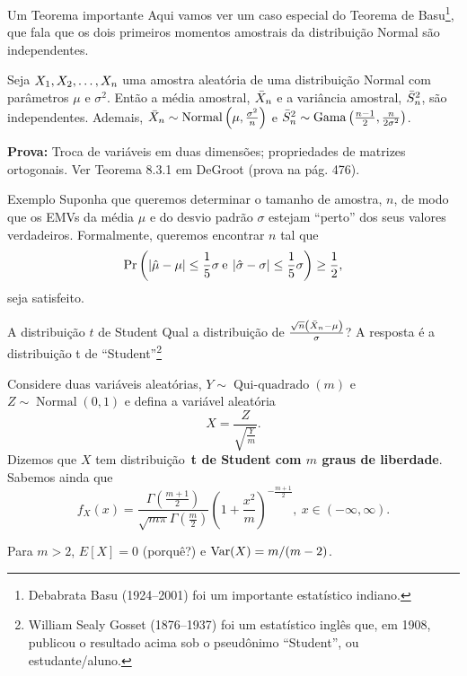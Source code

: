 \begin{frame}{Um Teorema importante}
 Aqui vamos ver um caso especial do Teorema de Basu\footnote{Debabrata Basu (1924--2001) foi um importante estatístico indiano.}, que fala que os dois primeiros momentos amostrais da distribuição Normal são independentes.
 \begin{theo}
  Seja $X_1, X_2, \ldots, X_n$ uma amostra aleatória de uma distribuição Normal com parâmetros $\mu$ e $\sigma^2$.
  Então a média amostral, $\bar{X}_n$ e a variância amostral, $\bar{S}^2_n$, são independentes.
  Ademais, $\bar{X}_n \sim \operatorname{Normal}\left(\mu, \frac{\sigma^2}{n}\right)$ e $\bar{S}^2_n \sim \operatorname{Gama}\left(\frac{n-1}{2},  \frac{n}{2\sigma^2}\right)$.
 \end{theo}
\textbf{Prova:} Troca de variáveis em duas dimensões; propriedades de matrizes ortogonais.
Ver Teorema 8.3.1 em DeGroot (prova na pág. 476).
\end{frame}

\begin{frame}{Exemplo}
 Suponha que queremos determinar o tamanho de amostra, $n$, de modo que os EMVs da média $\mu$ e do desvio padrão $\sigma$ estejam ``perto'' dos seus valores verdadeiros.
 Formalmente, queremos encontrar $n$ tal que
 \[ \operatorname{Pr}\left( \left|\hat{\mu} - \mu\right| \leq \frac{1}{5}\sigma \: \text{e} \: \left|\hat{\sigma}-\sigma\right| \leq  \frac{1}{5}\sigma \right) \geq \frac{1}{2} ,\]
 seja satisfeito.
\end{frame}

\begin{frame}{A distribuição $t$ de Student}
 Qual a distribuição de $\frac{\sqrt{n}\left(\bar{X}_n - \mu\right)}{\sigma}$?
 A resposta é a distribuição t de ``Student''\footnote{William Sealy Gosset (1876--1937) foi um estatístico inglês que, em 1908, publicou o resultado acima sob o pseudônimo ``Student'', ou estudante/aluno.}
 
 \begin{defn}[A distribuição t]
  Considere duas variáveis aleatórias, $Y \sim\operatorname{Qui-quadrado}(m)$ e $Z \sim\operatorname{Normal}(0, 1)$ e defina a variável aleatória
  \[ X = \frac{Z}{\sqrt{\frac{Y}{m}}}. \]
 Dizemos que $X$  tem distribuição~\textbf{t de Student com $m$ graus de liberdade}. 
 Sabemos ainda que
 \[f_X(x) = \frac{\Gamma(\frac{m + 1}{2})}{\sqrt{m\pi}\Gamma(\frac{m}{2})} \left(1 + \frac{x^2}{m}\right)^{-\frac{m+1}{2}},\: x \in (-\infty, \infty). \]
 \end{defn}
Para $m>2$, $E[X] = 0$ (porquê?) e $\operatorname{Var}(X) = m/(m-2)$.
\end{frame}

